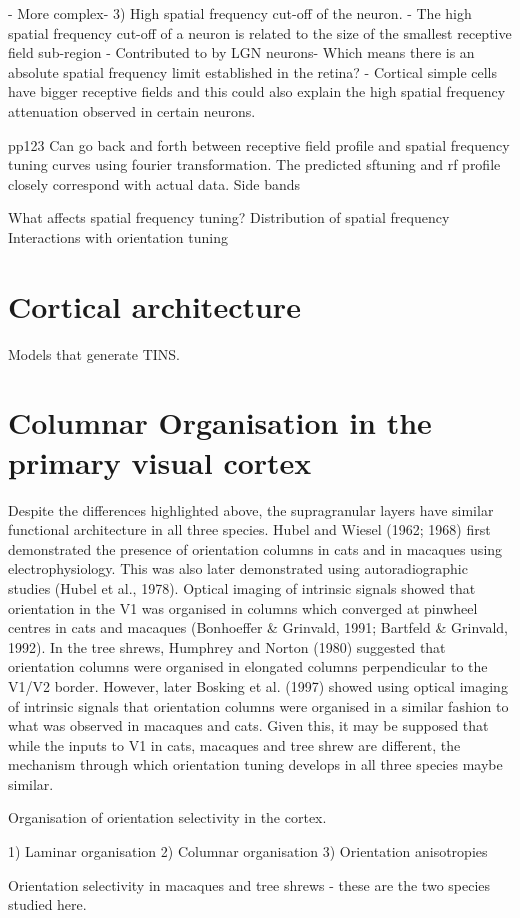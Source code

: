  - More complex- 
 3) High spatial frequency cut-off of the neuron.
    - The high spatial frequency cut-off of a neuron is related to the size of the smallest receptive field sub-region - Contributed to by LGN neurons- Which means there is an absolute spatial frequency limit established in the retina? 
    - Cortical simple cells have bigger receptive fields and this could also explain the high spatial frequency attenuation observed in certain neurons. 
    
    
    

\cite{DeValois1990a} pp123 Can go back and forth between receptive field profile and spatial frequency tuning curves using fourier transformation. The predicted sftuning and rf profile closely correspond with actual data. Side bands 


What affects spatial frequency tuning?
Distribution of spatial frequency
Interactions with orientation tuning


\section{Cortical architecture}

Models that generate
TINS.
\section{Columnar Organisation in the primary visual cortex}
Despite the differences highlighted above, the supragranular layers have similar functional architecture in all three species. Hubel and Wiesel (1962; 1968) first demonstrated the presence of orientation columns in cats and in macaques using electrophysiology. This was also later demonstrated using autoradiographic studies (Hubel et al., 1978). Optical imaging of intrinsic signals showed that orientation in the V1 was organised in columns which converged at pinwheel centres in cats and macaques (Bonhoeffer \& Grinvald, 1991; Bartfeld \& Grinvald, 1992). In the tree shrews, Humphrey and Norton (1980) suggested that orientation columns were organised in elongated columns perpendicular to the V1/V2 border. However, later Bosking et al. (1997) showed using optical imaging of intrinsic signals that orientation columns were organised in a similar fashion to what was observed in macaques and cats. Given this, it may be supposed that while the inputs to V1 in cats, macaques and tree shrew are different, the mechanism through which orientation tuning develops in all three species maybe similar. 

Organisation of orientation selectivity in the cortex.

1) Laminar organisation
2) Columnar organisation
3) Orientation anisotropies

Orientation selectivity in macaques and tree shrews - these are the two species studied here.

